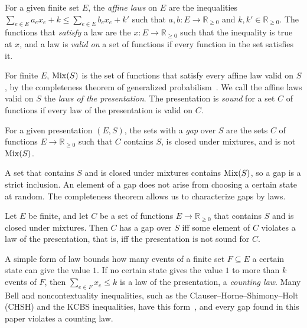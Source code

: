\begin{definition}
\label{def:affine-law}
For a given finite set $E$, the \emph{affine laws} on $E$ are the
inequalities $\sum_{e \in E} a_e x_e + k \le \sum_{e \in E} b_e x_e + k'$
such that $a, b : E \to \mathbb{R}_{\ge 0}$ and
$k, k' \in \mathbb{R}_{\ge 0}$. The functions that \emph{satisfy} a law are
the $x : E \to \mathbb{R}_{\ge 0}$ such that the inequality is true at
$x$, and a law is \emph{valid on} a set of functions if every function in
the set satisfies it.
\end{definition}

\noindent
For finite $E$, $\mathrm{Mix}(S)$ is the set of
functions that satisfy every affine law valid on $S$, by the completeness
theorem of generalized probabilism~\cite{definetti1974,paris2001}.
We call the affine laws valid on $S$ the \emph{laws of the presentation}.
The presentation is \emph{sound} for a set $C$ of functions if every law
of the presentation is valid on $C$.

\begin{definition}[gap]
\label{def:gap}
For a given presentation $(E, S)$, the sets with a \emph{gap} over $S$
are the sets $C$ of functions $E \to \mathbb{R}_{\ge 0}$ such that $C$
contains $S$, is closed under mixtures, and is not $\mathrm{Mix}(S)$.
\end{definition}

\noindent
A set that contains $S$ and is closed under mixtures contains $\mathrm{Mix}(S)$,
so a gap is a strict inclusion. An element of a gap does not arise from
choosing a certain state at random. The completeness theorem allows us to
characterize gaps by laws.

\begin{corollary}
\label{cor:gap-law}
Let $E$ be finite, and let $C$ be a set of functions
$E \to \mathbb{R}_{\ge 0}$ that contains $S$ and is closed under mixtures.
Then $C$ has a gap over $S$ iff some element of $C$ violates a law of the presentation, that is,
iff the presentation is not sound for $C$.
\end{corollary}

\noindent
A simple form of law bounds how
many events of a finite set $F \subseteq E$ a certain state can give the
value $1$. If no certain state gives the value $1$ to more than $k$
events of $F$, then $\sum_{e \in F} x_e \le k$ is a law of the
presentation, a \emph{counting law}. Many Bell and noncontextuality
inequalities, such as the Clauser--Horne--Shimony--Holt (CHSH) and the KCBS
inequalities, have this
form~\cite{pitowsky1991,cabello2014}, and every gap
found in this paper violates a counting law.

